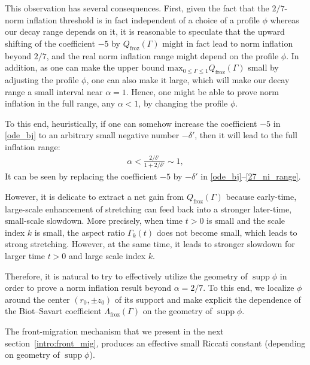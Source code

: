 \documentclass[reqno,11pt]{amsart}
\newcommand{\supp}{\operatorname{supp}}
\begin{document}
This observation has several consequences. First, given the fact that the $2/7$-norm inflation threshold is in fact independent of a choice of a profile $\phi$ whereas our decay range depends on it, it is reasonable to speculate that the upward shifting of the coefficient $-5$ by $Q_{\mathrm{froz}}(\Gamma)$ might in fact lead to norm inflation beyond $2/7$, and the real norm inflation range might depend on the profile $\phi$. In addition, as one can make the upper bound $\mathrm{max}_{0\leq \Gamma \leq 1} Q_{\mathrm{froz}}(\Gamma)$ small by adjusting the profile $\phi$, one can also make it large, which will make our decay range a small interval near $\alpha=1$. Hence, one might be able to prove norm inflation in the full range, any $\alpha<1$, by changing the profile $\phi$.

To this end, heuristically, if one can somehow increase the coefficient $-5$ in \eqref{ode_bj} to an arbitrary small negative number $-\delta'$, then it will lead to the full inflation range:
    \begin{align}
    \label{zeta_full_range}
        \alpha< \frac{2/\delta'}{1+2/\delta'} \sim 1,
    \end{align}
It can be seen by replacing the coefficient $-5$ by $-\delta'$ in \eqref{ode_bj}--\eqref{27_ni_range}. 

However, it is delicate to extract a net gain from $Q_{\mathrm{froz}}(\Gamma)$ because early-time, large-scale enhancement of stretching can feed back into a
stronger later-time, small-scale slowdown. More precisely, when time $t>0$ is small and the scale index $k$ is small, the aspect ratio $\Gamma_k(t)$ does not become small, which leads to strong stretching. However, at the same time, it leads to stronger slowdown for larger time $t>0$ and large scale index $k$.




Therefore, it is natural to try to effectively utilize  the geometry of $\supp \phi$ in order to prove a norm inflation result beyond $\alpha=2/7$. To this end, we localize $\phi$ around the center $(r_0,\pm z_0)$ of its support and make explicit the dependence of the Biot--Savart coefficient $\Lambda_{\mathrm{froz}}(\Gamma)$ on the geometry of $\supp \phi$.

The front-migration mechanism that we present in the next section~\ref{intro:front_mig}, produces an effective small Riccati constant (depending on geometry of $\supp \phi$).
\end{document}
